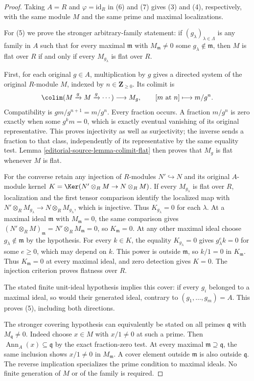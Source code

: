 \begin{proof}
Taking $A=R$ and $\varphi=\mathrm{id}_R$ in (6) and (7)
gives (3) and (4), respectively, with the same module $M$
and the same prime and maximal localizations.

For (5) we prove the stronger arbitrary-family statement:
if $(g_\lambda)_{\lambda\in\Lambda}$ is any family in $A$
such that for every maximal $\mathfrak m$ with
$M_{\mathfrak m}\ne0$ some $g_\lambda\notin\mathfrak m$,
then $M$ is flat over $R$ if and only if every
$M_{g_\lambda}$ is flat over $R$.

First, for each original $g\in A$, multiplication by $g$
gives a directed system of the original $R$-module $M$,
indexed by $n\in\mathbf Z_{\geq0}$. Its colimit is
$$
\colim(M\xrightarrow{g}M\xrightarrow{g}\cdots)
\longrightarrow M_g,\qquad [m\text{ at }n]\longmapsto m/g^n.
$$
Compatibility is $gm/g^{n+1}=m/g^n$.
Every fraction occurs. A fraction $m/g^n$ is zero exactly
when some $g^k m=0$, which is exactly eventual vanishing
of its original representative. This proves injectivity
as well as surjectivity; the inverse sends a fraction to
that class, independently of its representative by the
same equality test. Lemma \ref{editorial-source-lemma-colimit-flat} then
proves that $M_g$ is flat whenever $M$ is flat.

For the converse retain any injection of $R$-modules
$N'\hookrightarrow N$ and its original $A$-module kernel
$K=\Ker(N'\otimes_R M\to N\otimes_R M)$.
If every $M_{g_\lambda}$ is flat over $R$, localization
and the first tensor comparison identify the localized
map with
$N'\otimes_R M_{g_\lambda}\to N\otimes_R M_{g_\lambda}$,
which is injective. Thus $K_{g_\lambda}=0$ for each $\lambda$.
At a maximal ideal $\mathfrak m$ with $M_{\mathfrak m}=0$,
the same comparison gives
$(N'\otimes_R M)_{\mathfrak m}=N'\otimes_R M_{\mathfrak m}=0$,
so $K_{\mathfrak m}=0$. At any other maximal ideal choose
$g_\lambda\notin\mathfrak m$ by the hypothesis.
For every $k\in K$, the equality $K_{g_\lambda}=0$ gives
$g_\lambda^e k=0$ for some $e\geq0$, which may depend
on $k$. This power is outside $\mathfrak m$, so $k/1=0$
in $K_{\mathfrak m}$. Thus $K_{\mathfrak m}=0$ at every
maximal ideal, and zero detection gives $K=0$.
The injection criterion proves flatness over $R$.

The stated finite unit-ideal hypothesis implies this cover:
if every $g_i$ belonged to a maximal ideal, so would their
generated ideal, contrary to $(g_1,\ldots,g_m)=A$.
This proves (5), including both directions.

The stronger covering hypothesis can equivalently be
stated on all primes $\mathfrak q$ with $M_{\mathfrak q}\ne0$.
Indeed choose $x\in M$ with $x/1\ne0$ at such a prime.
Then $\operatorname{Ann}_A(x)\subseteq\mathfrak q$ by
the exact fraction-zero test. At every maximal
$\mathfrak m\supseteq\mathfrak q$, the same inclusion
shows $x/1\ne0$ in $M_{\mathfrak m}$. A cover element
outside $\mathfrak m$ is also outside $\mathfrak q$.
The reverse implication specializes the prime condition
to maximal ideals. No finite generation of $M$ or of the
family is required.


\end{proof}
